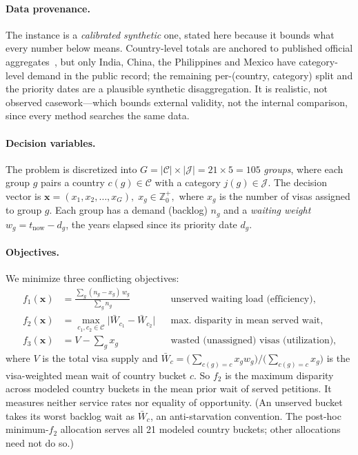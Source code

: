 \documentclass[runningheads]{llncs}
\begin{document}
\paragraph{Data provenance.}
The instance is a \emph{calibrated synthetic} one, stated here because it bounds what every number below means. Country-level totals are anchored to published official aggregates~\cite{cato,uscis,dos}, but only India, China, the Philippines and Mexico have category-level demand in the public record; the remaining per-(country, category) split and the priority dates are a plausible synthetic disaggregation. It is realistic, not observed casework---which bounds external validity, not the internal comparison, since every method searches the same data.

\paragraph{Decision variables.}
The problem is discretized into $G = |\mathcal{C}| \times |\mathcal{J}| = 21 \times 5 = 105$ \emph{groups}, where each group $g$ pairs a country $c(g)\in\mathcal{C}$ with a category $j(g)\in\mathcal{J}$. The decision vector is
\(
\mathbf{x} = (x_1, x_2, \dots, x_G),\; x_g \in \mathbb{Z}^{+}_0,
\)
where $x_g$ is the number of visas assigned to group $g$. Each group has a demand (backlog) $n_g$ and a \emph{waiting weight} $w_g = t_{\text{now}} - d_g$, the years elapsed since its priority date $d_g$.

\paragraph{Objectives.}
We minimize three conflicting objectives:
\begin{align}
f_1(\mathbf{x}) &= \frac{\sum_{g}(n_g - x_g)\,w_g}{\sum_{g} n_g}
&&\text{unserved waiting load (efficiency),}\\
f_2(\mathbf{x}) &= \max_{c_1,c_2 \in \mathcal{C}}\bigl|\bar{W}_{c_1} - \bar{W}_{c_2}\bigr|
&&\text{max.\ disparity in mean served wait,}\\
f_3(\mathbf{x}) &= V - \textstyle\sum_{g} x_g
&&\text{wasted (unassigned) visas (utilization),}
\end{align}
where $V$ is the total visa supply and $\bar{W}_c = \big(\sum_{c(g)=c} x_g w_g\big)\big/\big(\sum_{c(g)=c} x_g\big)$ is the visa-weighted mean wait of country bucket $c$. So $f_2$ is the maximum disparity across modeled country buckets in the mean prior wait of served petitions. It measures neither service rates nor equality of opportunity. (An unserved bucket takes its worst backlog wait as $\bar{W}_c$, an anti-starvation convention. The post-hoc minimum-$f_2$ allocation serves all 21 modeled country buckets; other allocations need not do so.)
\end{document}
